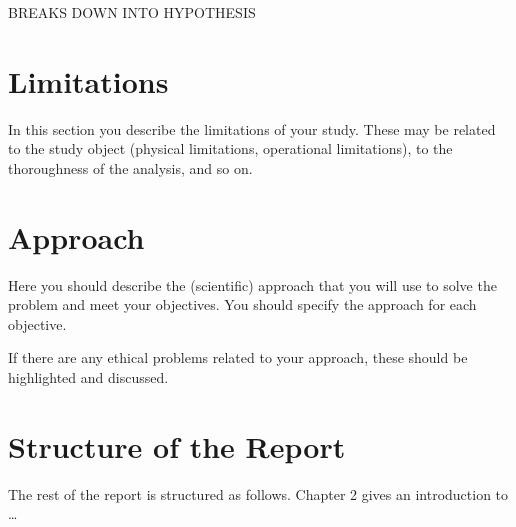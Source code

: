BREAKS DOWN INTO HYPOTHESIS

\section{Limitations}
In this section you describe the limitations of your study. These may be related to the study object (physical limitations, operational limitations), to the thoroughness of the analysis, and so on.

%
\section{Approach}
Here you should describe the (scientific) approach that you will use to solve the problem and meet your objectives. You should specify the approach for each objective.

If there are any ethical problems related to your approach, these should be highlighted and discussed.
\section{Structure of the Report}
The rest of the report is structured as follows. Chapter 2 gives an introduction to \ldots

